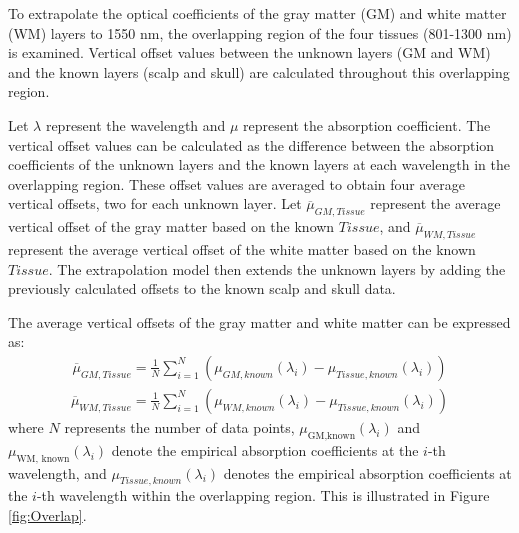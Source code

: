 \documentclass[journal,twoside,web]{ieeecolor}
\begin{document}
To extrapolate the optical coefficients of the gray matter (GM) and white matter (WM) layers to 1550 nm, the overlapping region of the four tissues 
(801-1300 nm) is examined. Vertical offset values between the unknown layers (GM and WM) and the known layers (scalp and skull) are calculated throughout 
this overlapping region.

Let \( \lambda \) represent the wavelength and \( \mu \) represent the absorption coefficient. The vertical offset values can be calculated as the 
difference between the absorption coefficients of the unknown layers and the known layers at each wavelength in the overlapping region. 
These offset values are averaged to obtain four average vertical offsets, two for each unknown layer. Let $\overline{\mu}_{GM, Tissue}$ represent the 
average vertical offset of the gray matter based on the known $Tissue$, and $\overline{\mu}_{WM, Tissue}$ represent the average vertical offset of the white 
matter based on the known $Tissue$. The extrapolation model then extends the unknown layers by adding the previously calculated offsets to the known scalp 
and skull data.

The average vertical offsets of the gray matter and white matter can be expressed as:
\begin{equation}
    \label{eq:AvgGM}
    \begin{aligned}
    \overline{\mu}_{GM, Tissue} = \frac{1}{N} \sum_{i=1}^{N} (\mu_{GM,known}(\lambda_i) - \mu_{Tissue, known}(\lambda_i)) 
    \end{aligned}
\end{equation}
\begin{equation}
    \label{eq:AvgWM}
    \begin{aligned}
    \overline{\mu}_{WM, Tissue} = \frac{1}{N} \sum_{i=1}^{N} (\mu_{WM,known}(\lambda_i) - \mu_{Tissue, known}(\lambda_i))

    \end{aligned}
\end{equation}
where \( N \) represents the number of data points, \( \mu_{\text{GM,known}}(\lambda_i) \) and \( \mu_{\text{WM, known}}(\lambda_i) \) 
denote the empirical absorption coefficients at the \( i \)-th wavelength, and \( \mu_{Tissue,known}(\lambda_i) \) denotes 
the empirical absorption coefficients at the \( i \)-th wavelength within the overlapping region. This is illustrated in Figure \ref{fig:Overlap}.
\end{document}
